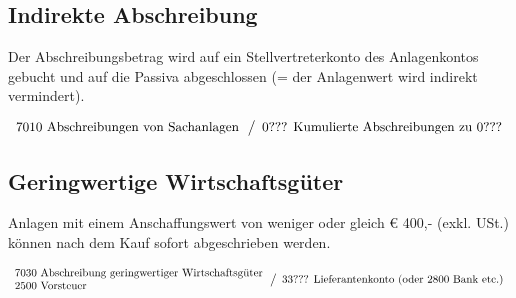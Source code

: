 \documentclass[a4paper,9pt]{article}
\begin{document}
\subsection{Indirekte Abschreibung}
Der Abschreibungsbetrag wird auf ein Stellvertreterkonto des
Anlagenkontos gebucht und auf die Passiva abgeschlossen (= der
Anlagenwert wird indirekt vermindert).

\begin{equation*}
  \begin{array}{l}
    \text{7010 Abschreibungen von Sachanlagen}\\
  \end{array}
  \left\slash
    \begin{array}{l}
      \text{0??? Kumulierte Abschreibungen zu 0???}\\
    \end{array}
  \right.
\end{equation*}

\subsection{Geringwertige Wirtschaftsgüter}
Anlagen mit einem Anschaffungswert von weniger oder gleich \euro{}
400,- (exkl. USt.) können nach dem Kauf sofort abgeschrieben werden.

\begin{equation*}
  \begin{array}{l}
    \text{7030 Abschreibung geringwertiger Wirtschaftsgüter}\\
    \text{2500 Vorsteuer}\\
  \end{array}
  \left\slash
    \begin{array}{l}
      \text{33??? Lieferantenkonto (oder 2800 Bank etc.)}\\
    \end{array}
  \right.
\end{equation*}
\end{document}
